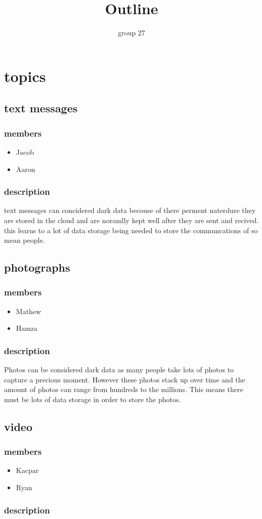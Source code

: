 \documentclass{article}
\begin{document}
\title{Outline}
\author{group 27}

\maketitle
\newpage


\section{topics}
\subsection{text messages} 
\subsubsection{members}
\begin{itemize}
    \item Jacob
    \item Aaron
\end{itemize}
\subsubsection{description}
 text messages can concidered dark data becouse of there perment naterdure they are stored in the cloud and 
 are noramlly kept well after they are sent and recived. this learns to a lot of data storage being needed to
 store the communcations of so mean people.

\subsection{photographs}
\subsubsection{members}
\begin{itemize}
    \item Mathew
    \item Hamza
\end{itemize}
\subsubsection{description}
Photos can be considered dark data as many people take lots of photos to capture a precious moment. However these photos stack up over time and the amount of photos can range from hundreds to the millions. This means there must be lots of data storage in order to store the photos.

\subsection{video}
\subsubsection{members}
\begin{itemize}
    \item Kacpar
    \item Ryan
\end{itemize}
\subsubsection{description}
\end{document}
